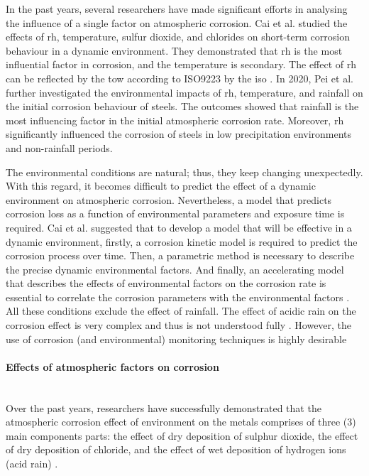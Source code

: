 In the past years, several researchers have made significant efforts in analysing the influence of a single factor on atmospheric corrosion. Cai et al. \cite{cai2018influence} studied the effects of \acrshort{rh}, temperature, sulfur dioxide, and chlorides on short-term corrosion behaviour in a dynamic environment. They demonstrated that \acrshort{rh} is the most influential factor in corrosion, and the temperature is secondary. The effect of \acrshort{rh} can be reflected by the \acrfull{tow} according to ISO9223 by the \Acrfull{iso} \cite{cengel1998heat, islam2018effects}. In 2020, Pei et al. \cite{pei2021understanding} further investigated the environmental impacts of \acrshort{rh}, temperature, and rainfall on the initial corrosion behaviour of steels. The outcomes showed that rainfall is the most influencing factor in the initial atmospheric corrosion rate.  Moreover, \acrshort{rh} significantly influenced the corrosion of steels in low precipitation environments and non-rainfall periods.

The environmental conditions are natural; thus, they keep changing unexpectedly. With this regard, it becomes difficult to predict the effect of a dynamic environment on atmospheric corrosion. Nevertheless, a model that predicts corrosion loss as a function of environmental parameters and exposure time is required. Cai et al. \cite{cai2018influence} suggested that to develop a model that will be effective in a dynamic environment, firstly, a corrosion kinetic model is required to predict the corrosion process over time. Then, a parametric method is necessary to describe the precise dynamic environmental factors. And finally, an accelerating model that describes the effects of environmental factors on the corrosion rate is essential to correlate the corrosion parameters with the environmental factors \cite{loto2019performance}. All these conditions exclude the effect of rainfall. The effect of acidic rain on the corrosion effect is very complex and thus is not understood fully \cite{pei2021understanding}. However, the use of corrosion (and environmental) monitoring techniques is highly desirable

\paragraph{Effects of atmospheric factors on corrosion} \hfill \\
Over the past years, researchers have successfully demonstrated that the atmospheric corrosion effect of environment on the metals comprises of three (3) main components parts: the effect of dry deposition of sulphur dioxide, the effect of dry deposition of chloride, and the effect of wet deposition of hydrogen ions (acid rain) \cite{cai2018influence}.

